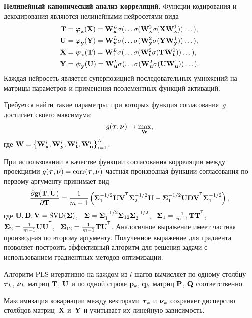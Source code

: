 \documentclass[11pt, a5paper]{dissert}
\begin{document}
\textbf{Нелинейный канонический анализ корреляций.}
Функции кодирования и декодирования являются нелинейными нейросетями вида
\begin{align*}
	\mathbf{T} &= \boldsymbol{\varphi}_{\mathbf{x}}(\mathbf{X}) =  \mathbf{W}_{\mathbf{x}}^L \sigma(\dots \sigma(\mathbf{W}_{\mathbf{x}}^2 \sigma(\mathbf{X} \mathbf{W}_{\mathbf{x}}^1)) \dots ), \\
	\mathbf{U} &= \boldsymbol{\varphi}_{\mathbf{y}}(\mathbf{Y}) =  \mathbf{W}_{\mathbf{y}}^L \sigma(\dots \sigma(\mathbf{W}_{\mathbf{y}}^2 \sigma(\mathbf{Y} \mathbf{W}_{\mathbf{y}}^1)) \dots ), \\
	\mathbf{X} &= \boldsymbol{\psi}_{\mathbf{x}}(\mathbf{T}) =  \mathbf{W}_{\mathbf{t}}^L \sigma(\dots \sigma(\mathbf{W}_{\mathbf{t}}^2 \sigma(\mathbf{T} \mathbf{W}_{\mathbf{t}}^1)) \dots ), \\
	\mathbf{Y} &= \boldsymbol{\psi}_{\mathbf{y}}(\mathbf{U}) =  \mathbf{W}_{\mathbf{u}}^L \sigma(\dots \sigma(\mathbf{W}_{\mathbf{u}}^2 \sigma(\mathbf{U} \mathbf{W}_{\mathbf{u}}^1)) \dots ).
\end{align*}
Каждая нейросеть является суперпозицией последовательных умножений на матрицы параметров и применения поэлементных функций активаций.

Требуется найти такие параметры, при которых функция согласования~$g$ достигает своего максимума:
\begin{equation}
	g(\boldsymbol{\tau}, \boldsymbol{\nu}) \rightarrow \max_{\mathbf{W}},
	\label{ch2:eq:concordance}
\end{equation}
где $\mathbf{W} = \bigl\{\mathbf{W}_{\mathbf{x}}^i, \mathbf{W}_{\mathbf{y}}^i, \mathbf{W}_{\mathbf{t}}^i, \mathbf{W}_{\mathbf{u}}^i\bigr\}_{i=1}^L$.

При использовании в качестве функции согласования корреляции между проекциями $g(\boldsymbol{\tau}, \boldsymbol{\nu}) = \textnormal{corr}(\boldsymbol{\tau}, \boldsymbol{\nu})$ частная производная функции согласования по первому аргументу принимает вид
\[
	\frac{\partial \mathbf{g}(\bT, \bU)}{\partial \bT} = \frac{1}{m - 1} \left(\bSigma_1^{-1/2} \bU \bV^{\T} \bSigma_2^{-1/2} \bU - \bSigma_1^{-1/2} \bU \bD \bV^{\T} \bSigma_1^{-1/2} \right),
\]
где $\mathbf{U}, \mathbf{D}, \mathbf{V} = \textnormal{SVD}(\boldsymbol{\Sigma})$, \, $\boldsymbol{\Sigma} = \boldsymbol{\Sigma}_1^{-1/2} \boldsymbol{\Sigma}_{12} \boldsymbol{\Sigma}_2^{-1/2} $, \, $\bSigma_1 = \frac{1}{m - 1} \bT \bT^{\T}$, \, $\bSigma_2 = \frac{1}{m - 1} \bU \bU^{\T}$, \, $\bSigma_{12} = \frac{1}{m - 1} \bT \bU^{\T}$.
Аналогичное выражение имеет частная производная по второму аргументу.
Полученное выражение для градиента позволяет построить эффективный алгоритм для решения задачи с использованием градиентных методов оптимизации.

Алгоритм PLS итеративно на каждом из $l$ шагов вычисляет по одному столбцу $\boldsymbol{\tau}_k$, $\boldsymbol{\nu}_k$ матриц $\mathbf{T}$, $\mathbf{U}$ и по одной строке $\mathbf{p}_k$, $\mathbf{q}_k$ матриц $\mathbf{P}$, $\mathbf{Q}$ соответственно. 

\begin{statement}
	Максимизация ковариации между векторами $\boldsymbol{\tau}_k$ и $\boldsymbol{\nu}_k$ сохраняет дисперсию столбцов матриц~$\mathbf{X}$ и~$\mathbf{Y}$ и учитывает их линейную зависимость.
\end{statement}
\end{document}
